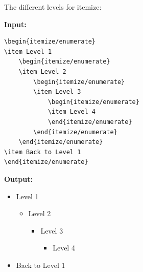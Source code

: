 The different levels for itemize:
\begin{multicols}{2}
\begin{minipage}{\linewidth}
\textbf{Input:} \\
\begin{verbatim}
\begin{itemize/enumerate}
\item Level 1 
    \begin{itemize/enumerate} 
    \item Level 2 
        \begin{itemize/enumerate} 
        \item Level 3 
            \begin{itemize/enumerate}
            \item Level 4 
            \end{itemize/enumerate} 
        \end{itemize/enumerate} 
    \end{itemize/enumerate} 
\item Back to Level 1 
\end{itemize/enumerate} 
\end{verbatim}
\end{minipage}

    \begin{minipage}{\linewidth}
        \textbf{Output:} \\
        \begin{itemize}
            \item Level 1
            \begin{itemize}
                \item Level 2
                \begin{itemize}
                    \item Level 3
                    \begin{itemize}
                        \item Level 4
                    \end{itemize}
                \end{itemize}
            \end{itemize}
            \item Back to Level 1
        \end{itemize}
    \end{minipage}
\end{multicols}

